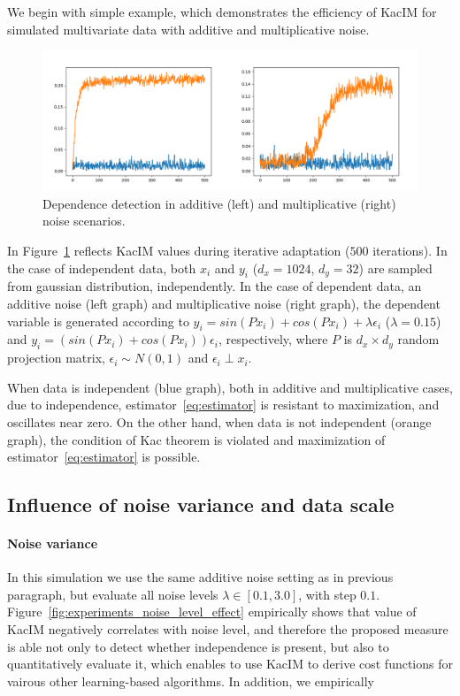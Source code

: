 \documentclass{article}
\begin{document}
{We begin with simple example, which demonstrates the efficiency of KacIM for simulated multivariate data with additive and multiplicative noise.

\begin{figure}[t]
\label{fig:experiments_simulation}
\centering
\includegraphics[scale=0.25]{./out.png}
\caption{Dependence detection in additive (left) and multiplicative (right) noise scenarios.}
\end{figure}

In Figure~\ref{fig:experiments_simulation} reflects KacIM values during iterative adaptation ($500$ iterations). In the case of independent data, both $x_{i}$ and $y_{i}$ ($d_{x} = 1024$, $d_{y} = 32$) are sampled from gaussian distribution, independently. In the case of dependent data, an additive noise (left graph) and multiplicative noise (right graph), the dependent variable is generated according to $y_{i} = sin(P x_{i}) + cos(P x_{i}) + \lambda \epsilon_{i}$ ($\lambda = 0.15$) and $y_{i} = (sin(P x_{i}) + cos(P x_{i})) \epsilon_{i}$, respectively, where $P$ is $d_{x} \times d_{y}$ random projection matrix, $\epsilon_{i} \sim N(0,1)$ and $\epsilon_{i} \perp x_{i}$.

When data is independent (blue graph), both in additive and multiplicative cases, due to independence, estimator~\eqref{eq:estimator} is resistant to maximization, and oscillates near zero. On the other hand, when data is not independent (orange graph), the condition of Kac theorem is violated and maximization of estimator~\eqref{eq:estimator} is possible.

\subsection{Influence of noise variance and data scale}
\paragraph{Noise variance} In this simulation we use the same additive noise setting as in previous paragraph, but evaluate all noise levels $\lambda \in [0.1, 3.0]$, with step $0.1$.
Figure~\ref{fig:experiments_noise_level_effect} empirically shows that value of KacIM  negatively correlates with noise level, and therefore the proposed measure is able not only to detect whether independence is present, but also to quantitatively evaluate it, which enables to use KacIM to derive cost functions for vairous other learning-based algorithms. 
In addition, we empirically

}
\end{document}
